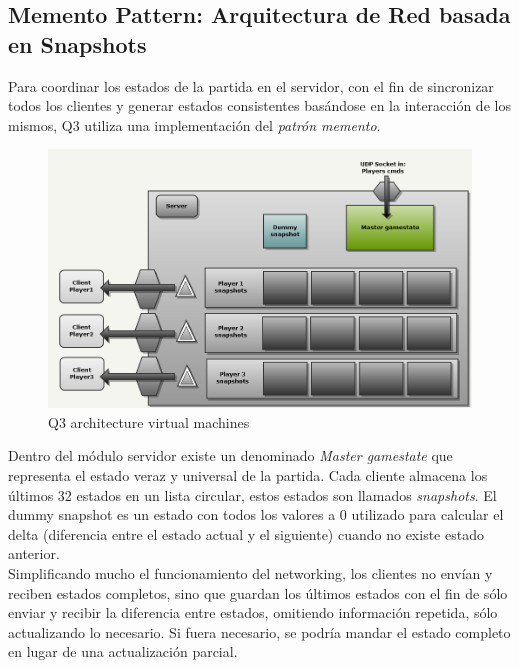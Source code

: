 \documentclass[a4paper,12pt]{report}
\begin{document}
    \subsection{Memento Pattern: Arquitectura de Red basada en Snapshots}
	Para coordinar los estados de la partida en el servidor, con el fin de sincronizar todos los clientes y generar estados consistentes basándose en la interacción de los mismos, Q3 utiliza una implementación del \textit{patrón memento}.\\
	
	\begin{center}
		\begin{figure}[h]
			\includegraphics[width=1\textwidth]{images/q3_network_arch}
			\caption{Q3 architecture virtual machines}
			\label{figq3network}
		\end{figure}
	\end{center}

	Dentro del módulo servidor existe un denominado \textit{Master gamestate} que representa el estado veraz y universal de la partida. Cada cliente almacena los últimos 32 estados en un lista circular, estos estados son llamados \textit{snapshots}. El dummy snapshot es un estado con todos los valores a 0 utilizado para calcular el delta (diferencia entre el estado actual y el siguiente) cuando no existe estado anterior.\\
	
	Simplificando mucho el funcionamiento del networking, los clientes no envían y reciben estados completos, sino que guardan los últimos estados con el fin de sólo enviar y recibir la diferencia entre estados, omitiendo información repetida, sólo actualizando lo necesario. Si fuera necesario, se podría mandar el estado completo en lugar de una actualización parcial.\\
	
\end{document}
